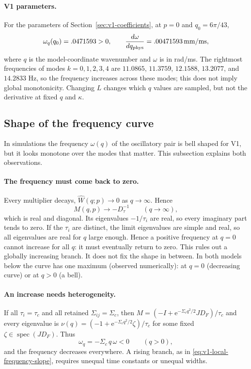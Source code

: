 \documentclass[11pt]{article}
\newcommand{\ee}{\mathrm{e}}
\begin{document}
\paragraph{V1 parameters.}
For the parameters of Section~\ref{sec:v1-coefficients}, at $p=0$ and
$q_0=6\pi/43$,
\begin{equation}
 \omega_q(q_0)=.0471593>0,\qquad
 \frac{d\omega}{dq_{\rm phys}}=.00471593\,\mathrm{mm/ms},
 \label{eq:v1-local-frequency-slope}
\end{equation}
where $q$ is the model-coordinate wavenumber and $\omega$ is in rad/ms.
The rightmost frequencies of modes $k=0,1,2,3,4$ are
$11.0865$, $11.3759$, $12.1588$, $13.2077$, and $14.2833$ Hz, so the
frequency increases across these modes; this does not imply global
monotonicity. Changing $L$ changes which $q$ values are sampled, but not the
derivative at fixed $q$ and $\kappa$.

\subsection{Shape of the frequency curve}
\label{sec:frequency-shape}
In simulations the frequency $\omega(q)$ of the oscillatory pair is bell
shaped for V1, but it looks monotone over the modes that matter. This
subsection explains both observations.

\paragraph{The frequency must come back to zero.}
Every multiplier decays, $\widehat W(q;p)\to0$ as $q\to\infty$. Hence
\begin{equation}
 M(q,p)\to-D_\tau^{-1}\qquad(q\to\infty),
 \label{eq:large-q-limit}
\end{equation}
which is real and diagonal. Its eigenvalues $-1/\tau_i$ are real, so every
imaginary part tends to zero. If the $\tau_i$ are distinct, the limit
eigenvalues are simple and real, so all eigenvalues are real for $q$ large
enough. Hence a positive frequency at $q=0$ cannot increase for all $q$: it
must eventually return to zero. This rules out a globally increasing branch.
It does not fix the shape in between. In both models below the curve has one
maximum (observed numerically): at $q=0$ (decreasing curve) or at $q>0$ (a
bell).

\paragraph{An increase needs heterogeneity.}
If all $\tau_i=\tau_c$ and all retained $\Sigma_{ij}=\Sigma_c$, then
$M=(-I+\ee^{-\Sigma_cq^2/2}J D_F)/\tau_c$ and every eigenvalue is
$\nu(q)=(-1+\ee^{-\Sigma_cq^2/2}\zeta)/\tau_c$ for some fixed
$\zeta\in\operatorname{spec}(JD_F)$. Thus
\begin{equation}
 \omega_q=-\Sigma_c\,q\,\omega<0\qquad(q>0),
 \label{eq:homogeneous-frequency}
\end{equation}
and the frequency decreases everywhere. A rising branch, as in
\eqref{eq:v1-local-frequency-slope}, requires unequal time constants or
unequal widths.
\end{document}
